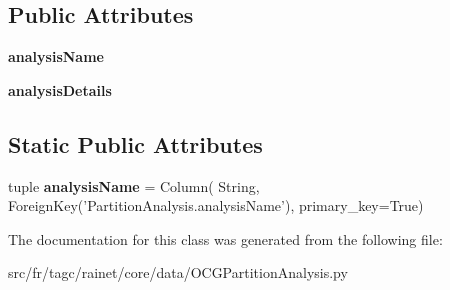 \subsection*{Public Attributes}
\begin{DoxyCompactItemize}
\item 
\hypertarget{classsrc_1_1fr_1_1tagc_1_1rainet_1_1core_1_1data_1_1OCGPartitionAnalysis_1_1OCGPartitionAnalysis_a40ffdc33f4e5175977b4f69e70c0b5cb}{{\bfseries analysis\-Name}}\label{classsrc_1_1fr_1_1tagc_1_1rainet_1_1core_1_1data_1_1OCGPartitionAnalysis_1_1OCGPartitionAnalysis_a40ffdc33f4e5175977b4f69e70c0b5cb}

\item 
\hypertarget{classsrc_1_1fr_1_1tagc_1_1rainet_1_1core_1_1data_1_1OCGPartitionAnalysis_1_1OCGPartitionAnalysis_a600e9157b516243ff2f10e4672a77827}{{\bfseries analysis\-Details}}\label{classsrc_1_1fr_1_1tagc_1_1rainet_1_1core_1_1data_1_1OCGPartitionAnalysis_1_1OCGPartitionAnalysis_a600e9157b516243ff2f10e4672a77827}

\end{DoxyCompactItemize}
\subsection*{Static Public Attributes}
\begin{DoxyCompactItemize}
\item 
\hypertarget{classsrc_1_1fr_1_1tagc_1_1rainet_1_1core_1_1data_1_1OCGPartitionAnalysis_1_1OCGPartitionAnalysis_ab73b5f87c9ad7234db108ce0f90237a5}{tuple {\bfseries analysis\-Name} = Column( String, Foreign\-Key('Partition\-Analysis.\-analysis\-Name'), primary\-\_\-key=True)}\label{classsrc_1_1fr_1_1tagc_1_1rainet_1_1core_1_1data_1_1OCGPartitionAnalysis_1_1OCGPartitionAnalysis_ab73b5f87c9ad7234db108ce0f90237a5}

\end{DoxyCompactItemize}


The documentation for this class was generated from the following file\-:\begin{DoxyCompactItemize}
\item 
src/fr/tagc/rainet/core/data/O\-C\-G\-Partition\-Analysis.\-py\end{DoxyCompactItemize}
